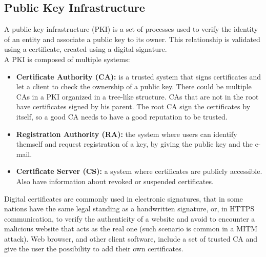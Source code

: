 \subsection{Public Key Infrastructure}
A public key infrastructure (PKI) is a set of processes used to verify the identity of an entity and associate a public key to its owner. This relationship is validated using a certificate, created using a digital signature.\\
A PKI is composed of multiple systems:
\begin{itemize}
    \item{\textbf{Certificate Authority (CA):} is a trusted system that signs certificates and let a client to check the ownership of a public key. There could be multiple CAs in a PKI organized in a tree-like structure. CAs that are not in the root have certificates signed by his parent. The root CA sign the certificates by itself, so a good CA needs to have a good reputation to be trusted.}
    \item{\textbf{Registration Authority (RA):} the system where users can identify themself and request registration of a key, by giving the public key and the e-mail.}
    \item{\textbf{Certificate Server (CS):} a system where certificates are publicly accessible. Also have information about revoked or suspended certificates.}
\end{itemize}
Digital certificates are commonly used in electronic signatures, that in some nations have the same legal standing as a handwritten signature, or, in HTTPS communication, to verify the authenticity of a website and avoid to encounter a malicious website that acts as the real one (such scenario is common in a MITM attack). Web browser, and other client software, include a set of trusted CA and give the user the possibility to add their own certificates.
